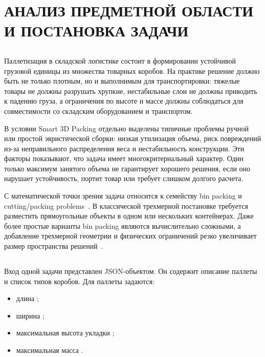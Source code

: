 \clearpage
\section[Анализ предметной области и постановка задачи]{\centering\MakeUppercase{Анализ предметной области и постановка задачи}}

\subsection{}

Паллетизация в складской логистике состоит в формировании устойчивой грузовой единицы из множества товарных коробов. На практике решение должно быть не только плотным, но и выполнимым для транспортировки: тяжелые товары не должны разрушать хрупкие, нестабильные слои не должны приводить к падению груза, а ограничения по высоте и массе должны соблюдаться для совместимости со складским оборудованием и транспортом.

В условии Smart 3D Packing отдельно выделены типичные проблемы ручной или простой эвристической сборки: низкая утилизация объема, риск повреждений из-за неправильного распределения веса и нестабильность конструкции. Эти факторы показывают, что задача имеет многокритериальный характер. Один только максимум занятого объема не гарантирует хорошего решения, если оно нарушает устойчивость, портит товар или требует слишком долгого расчета.

С математической точки зрения задача относится к семейству bin packing и cutting/packing problems~\cite{lodi2002}. В классической трехмерной постановке требуется разместить прямоугольные объекты в одном или нескольких контейнерах. Даже более простые варианты bin packing являются вычислительно сложными, а добавление трехмерной геометрии и физических ограничений резко увеличивает размер пространства решений~\cite{martello2000,lodi2002}.

\subsection{}

Вход одной задачи представлен JSON-объектом. Он содержит описание паллеты и список типов коробов. Для паллеты задаются:
\begin{itemize}
  \item длина ;
  \item ширина ;
  \item максимальная высота укладки ;
  \item максимальная масса .
\end{itemize}

